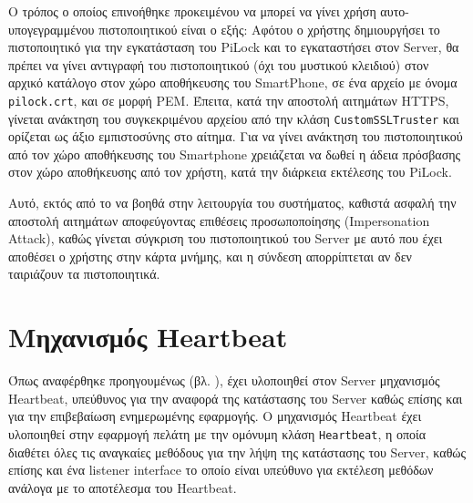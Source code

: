 		Ο τρόπος ο οποίος επινοήθηκε προκειμένου να μπορεί να γίνει χρήση αυτο-υπογεγραμμένου πιστοποιητικού είναι ο εξής: Αφότου ο χρήστης δημιουργήσει το πιστοποιητικό για την εγκατάσταση του PiLock και το εγκαταστήσει στον Server, θα πρέπει να γίνει αντιγραφή του πιστοποιητικού (όχι του μυστικού κλειδιού) στον αρχικό κατάλογο στον χώρο αποθήκευσης του SmartPhone, σε ένα αρχείο με όνομα \verb|pilock.crt|, και σε μορφή PEM. Έπειτα, κατά την αποστολή αιτημάτων HTTPS, γίνεται ανάκτηση του συγκεκριμένου αρχείου από την κλάση \verb|CustomSSLTruster| και ορίζεται ως άξιο εμπιστοσύνης στο αίτημα. Για να γίνει ανάκτηση του πιστοποιητικού από τον χώρο αποθήκευσης του Smartphone χρειάζεται να δωθεί η άδεια πρόσβασης στον χώρο αποθήκευσης από τον χρήστη, κατά την διάρκεια εκτέλεσης του PiLock.

		Αυτό, εκτός από το να βοηθά στην λειτουργία του συστήματος, καθιστά ασφαλή την αποστολή αιτημάτων αποφεύγοντας επιθέσεις προσωποποίησης (Impersonation Attack), καθώς γίνεται σύγκριση του πιστοποιητικού του Server με αυτό που έχει αποθέσει ο χρήστης στην κάρτα μνήμης, και η σύνδεση απορρίπτεται αν δεν ταιριάζουν τα πιστοποιητικά.

\section{Μηχανισμός Heartbeat}
	Όπως αναφέρθηκε προηγουμένως (βλ. ), έχει υλοποιηθεί στον Server μηχανισμός Heartbeat, υπεύθυνος για την αναφορά της κατάστασης του Server καθώς επίσης και για την επιβεβαίωση ενημερωμένης εφαρμογής. Ο μηχανισμός Heartbeat έχει υλοποιηθεί στην εφαρμογή πελάτη με την ομόνυμη κλάση \verb|Heartbeat|, η οποία διαθέτει όλες τις αναγκαίες μεθόδους για την λήψη της κατάστασης του Server, καθώς επίσης και ένα listener interface το οποίο είναι υπεύθυνο για εκτέλεση μεθόδων ανάλογα με το αποτέλεσμα του Heartbeat. 

